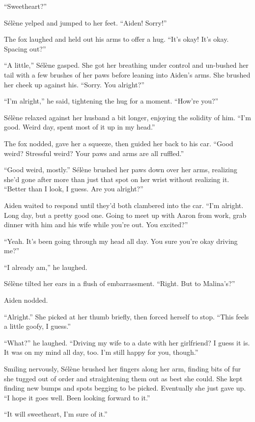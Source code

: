 ``Sweetheart?''

Sélène yelped and jumped to her feet. ``Aiden! Sorry!''

The fox laughed and held out his arms to offer a hug. ``It's okay! It's okay. Spacing out?''

``A little,'' Sélène gasped. She got her breathing under control and un-bushed her tail with a few brushes of her paws before leaning into Aiden's arms. She brushed her cheek up against his. ``Sorry. You alright?''

``I'm alright,'' he said, tightening the hug for a moment. ``How're you?''

Sélène relaxed against her husband a bit longer, enjoying the solidity of him. ``I'm good. Weird day, spent most of it up in my head.''

The fox nodded, gave her a squeeze, then guided her back to his car. ``Good weird? Stressful weird? Your paws and arms are all ruffled.''

``Good weird, mostly.'' Sélène brushed her paws down over her arms, realizing she'd gone after more than just that spot on her wrist without realizing it. ``Better than I look, I guess. Are you alright?''

Aiden waited to respond until they'd both clambered into the car. ``I'm alright. Long day, but a pretty good one. Going to meet up with Aaron from work, grab dinner with him and his wife while you're out. You excited?''

``Yeah. It's been going through my head all day. You sure you're okay driving me?''

``I already am,'' he laughed.

Sélène tilted her ears in a flush of embarrassment. ``Right. But to Malina's?''

Aiden nodded.

``Alright.'' She picked at her thumb briefly, then forced herself to stop. ``This feels a little goofy, I guess.''

``What?'' he laughed. ``Driving my wife to a date with her girlfriend? I guess it is. It was on my mind all day, too. I'm still happy for you, though.''

Smiling nervously, Sélène brushed her fingers along her arm, finding bits of fur she tugged out of order and straightening them out as best she could. She kept finding new bumps and spots begging to be picked. Eventually she just gave up. ``I hope it goes well. Been looking forward to it.''

``It will sweetheart, I'm sure of it.''

